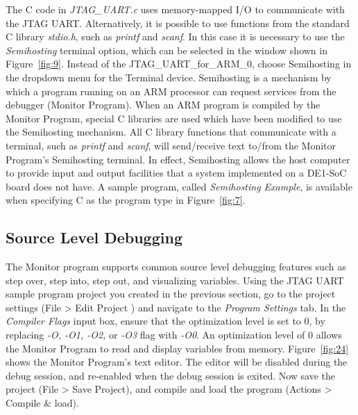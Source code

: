 \documentclass[11pt, twoside, pdftex]{article}
\begin{document}
The C code in {\it JTAG\_UART.c} uses memory-mapped I/O to
communicate with the JTAG UART. Alternatively, it is possible to
use functions from the standard C library {\it stdio.h}, such as
{\it printf} and {\it scanf}. In this case it is necessary to
use the {\it Semihosting} terminal option, which can be selected 
in the window shown in Figure~\ref{fig:9}. Instead of the JTAG\_UART\_for\_ARM\_0,
choose {\sf Semihosting} in the dropdown menu for the
{\sf Terminal device}. Semihosting is a mechanism by which a
program running on an ARM processor can request services from
the debugger (Monitor Program). When an ARM program is compiled
by the Monitor Program, special C libraries are used which have
been modified to use the Semihosting mechanism.
All C library functions that communicate with a terminal, such as 
{\it printf} and {\it scanf}, will send/receive text to/from
the Monitor Program's Semihosting terminal. In effect,
Semihosting allows the host computer to provide input and
output facilities that a system implemented on a DE1-SoC board
does not have.
A sample program, called {\it Semihosting Example}, is available
when specifying C as the program type in Figure~\ref{fig:7}.

\subsection{Source Level Debugging}
The Monitor program supports common source level debugging features such as step over, step into, 
step out, and visualizing variables. Using the JTAG UART sample program project you created in the previous section, 
go to the project settings ({\sf File > Edit Project }) and navigate to the {\it Program Settings} tab. 
In the {\it Compiler Flags} input box, ensure that the optimization level is set to 0, by replacing {\it -O, -O1, -O2, } 
or {\it -O3} flag with {\it -O0}. An optimization level of 0 allows the Monitor Program to read and display 
variables from memory. Figure~\ref{fig:24} shows the Monitor Program's text editor. The editor will be disabled
during the debug session, and re-enabled when the debug session is exited. Now save the project ({\sf File > Save Project}), 
and compile and load the program ({\sf Actions > Compile \& load}).
\end{document}
